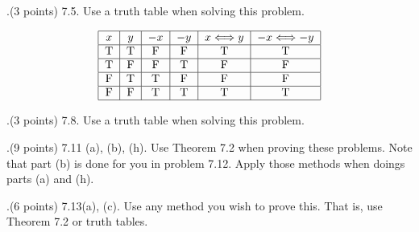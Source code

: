 \documentclass[12pt]{article}
\begin{document}
.(3 points) 7.5.  Use a truth table when solving this problem.      
\vspace{.15in}

\[ %
\begin{tabular}{|c|c|c|c|c|c|} 
\hline %
$x$ & $y$ & $-x$ & $-y$ & $x\Longleftrightarrow y$ & $-x \Longleftrightarrow -y$ \\ 
\hline
T&T&F&F&T&T \\
\hline 
T&F&F&T&F&F \\
\hline
F&T&T&F&F&F \\
\hline
F&F&T&T&T&T \\
\hline
\end{tabular} %
\] %

.(3 points) 7.8.  Use a truth table when solving this problem. 
\vspace{.15in}

.(9 points) 7.11 (a), (b), (h).  Use Theorem 7.2 when proving these problems.  Note that part (b) is done for you in problem 7.12.  Apply those methods when doings parts (a) and (h).  
\vspace{.15in}

.(6 points) 7.13(a), (c).   Use any method you wish to prove this.  That is, use Theorem 7.2 or truth tables.   
\vspace{.05in}
\end{document}

